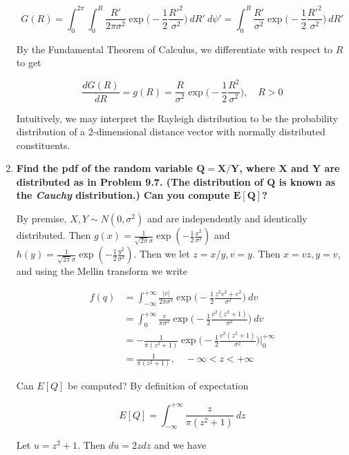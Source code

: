\documentclass[10pt, oneside]{article}   	%
\theoremstyle{definition}
\begin{document}
\begin{enumerate}[label=9.\arabic*]
\[ G(R) =  \int^{2 \pi}_0 \int^R_0 \frac{R'}{2 \pi \sigma^2} \exp \bigg( -\frac{1}{2} \frac{R'^2}{\sigma^2} \bigg) \ dR' \ d \psi' = \int^R_0 \frac{R'}{\sigma^2} \exp \bigg( -\frac{1}{2} \frac{R'^2}{\sigma^2} \bigg) \ dR'  \]

By the Fundamental Theorem of Calculus, we differentiate with respect to $R$ to get

\[ \frac{d G(R)}{dR} = \boxed{ g(R) = \frac{R}{\sigma^2} \exp \bigg( -\frac{1}{2} \frac{R^2}{\sigma^2} \bigg), \quad R > 0 } \]

Intuitively, we may interpret the Rayleigh distribution to be the probability distribution of a 2-dimensional distance vector with normally distributed constituents.

\item  \begin{tcolorbox}[
  colback=Cerulean!5!white,
  colframe=Cerulean!75!black]
\textbf{Find the pdf of the random variable $\bm{Q = X / Y}$, where $\bm{X}$ and $\bm{Y}$ are distributed as in Problem 9.7. (The distribution of $\bm{Q}$ is known as the \textit{Cauchy} distribution.) Can you compute $\bm{E[Q]}$?}
\end{tcolorbox}

By premise, $X, Y \sim N(0, \sigma^2)$ and are independently and identically distributed. Then $g(x) = \frac{1}{\sqrt{2 \pi} \sigma } \exp (-\frac{1}{2} \frac{x^2}{\sigma^2})$ and $h(y) = \frac{1}{\sqrt{2 \pi} \sigma } \exp (-\frac{1}{2} \frac{y^2}{\sigma^2})$. Then we let $z = x/y, v=y$. Then $x = vz, y = v$, and using the Mellin transform we write

\begin{align*}
f(q) &= \int^{+\infty}_{-\infty} \frac{|v|}{2 \pi \sigma^2} \exp \bigg( -\frac{1}{2} \frac{z^2 v^2 + v^2}{\sigma^2} \bigg) \ dv \\
&= \int^{+\infty}_0 \frac{v}{\pi \sigma^2} \exp \bigg( -\frac{1}{2} \frac{v^2 (z^2 + 1)}{\sigma^2} \bigg) \ dv \\
&= - \frac{1}{\pi (z^2 + 1)} \exp \bigg( -\frac{1}{2} \frac{v^2 (z^2 + 1)}{\sigma^2} \bigg) \bigg|^{+\infty}_0 \\
&= \boxed{ \frac{1}{\pi (z^2 + 1)}, \quad -\infty < z < +\infty }
\end{align*}

Can $E[Q]$ be computed? By definition of expectation

\[ E[Q] = \int^{+\infty}_{-\infty} \frac{z}{\pi (z^2 + 1)} \ dz \]

Let $u = z^2 + 1$. Then $du = 2z dz$ and we have


\end{enumerate}
\end{document}
